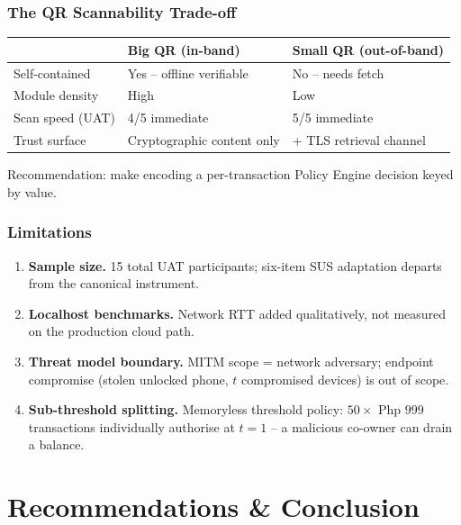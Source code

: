 \documentclass{beamer}
\newcommand{\pos}[1]{\textcolor{positive}{#1}}
\newcommand{\con}[1]{\textcolor{negative}{#1}}
\newcommand{\HL}[1]{\textcolor{emphasis}{#1}}
\begin{document}
\begin{frame}
  \frametitle{The QR Scannability Trade-off}
  \begin{center}
  \small
  \begin{tabular}{|p{}|p{}|p{}|}
    \hline
    & \textbf{Big QR (in-band)} & \textbf{Small QR (out-of-band)} \\\hline
    Self-contained & \pos{Yes -- offline verifiable} & \con{No -- needs fetch} \\\hline
    Module density & \con{High} & \pos{Low} \\\hline
    Scan speed (UAT) & 4/5 immediate & \pos{5/5 immediate} \\\hline
    Trust surface & \pos{Cryptographic content only} & \con{+ TLS retrieval channel} \\\hline
  \end{tabular}
  \end{center}
  \vspace{0.15cm}
  \HL{Recommendation:} make encoding a per-transaction Policy Engine decision keyed by value.
\end{frame}

\begin{frame}
  \frametitle{Limitations}
  \begin{enumerate}
      \item \textbf{Sample size.} 15 total UAT participants; six-item SUS adaptation departs from the canonical instrument.
      \item \textbf{Localhost benchmarks.} Network RTT added qualitatively, not measured on the production cloud path.
      \item \textbf{Threat model boundary.} MITM scope = network adversary; \HL{endpoint compromise} (stolen unlocked phone, $t$ compromised devices) is out of scope.
      \item \textbf{Sub-threshold splitting.} Memoryless threshold policy: $50 \times $ Php $999$ transactions individually authorise at $t=1$ -- a malicious co-owner can drain a balance.
  \end{enumerate}
\end{frame}

\section{Recommendations \& Conclusion}
\end{document}
